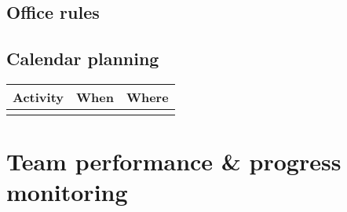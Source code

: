 \documentclass{article}
\begin{document}
\subsection{Office rules}

\subsection{Calendar planning}


\begin{tabel}
    \centering
    \begin{tabular}{l|l|l}
        \rowcolor{Gray}
        \textbf{Activity} & \textbf{When} & \textbf{Where}\\\hline
                             & &
    \end{tabular}
    \label{tab:roleTypes}
\end{tabel}

\section{Team performance \& progress monitoring}
\end{document}

